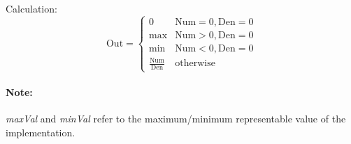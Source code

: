 %
%
%
%
%
%
%
%
Calculation:
\begin{equation*}
	\mathrm{Out}
		=
	\begin{cases}
		0 & \mathrm{Num} = 0, \mathrm{Den} = 0
		\\
		\max & \mathrm{Num} > 0, \mathrm{Den} = 0
		\\
		\min & \mathrm{Num} < 0, \mathrm{Den} = 0
		\\
		\frac{\mathrm{Num}}{\mathrm{Den}} & \mathrm{otherwise}
	\end{cases}
\end{equation*}
\paragraph{Note:}\textit{maxVal} and \textit{minVal} refer to the maximum/minimum representable value of the implementation.

